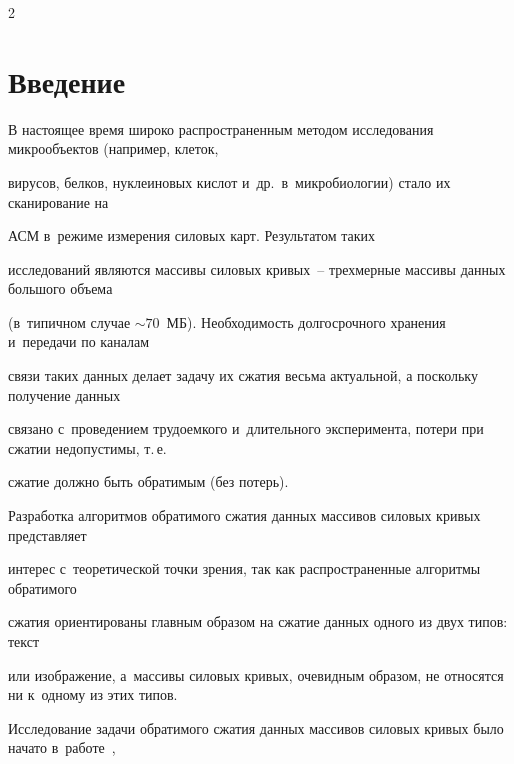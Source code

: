 


\thispagestyle{headings}



\begin{multicols}{2}



\label{st\stat}



\section{Введение}



\vspace*{-4pt}




В настоящее время широко распространенным методом исследования микрообъектов (например, клеток,

 вирусов, белков, нуклеиновых кислот и~др.\ в~микробиологии) стало их сканирование на 

АСМ в~режиме измерения силовых карт. Результатом таких 

 исследований являются массивы силовых кривых~-- трехмерные массивы данных большого объема 

 (в~типичном случае $\sim70$~МБ). Необходимость долгосрочного хранения и~передачи по каналам 

 связи таких данных делает задачу их сжатия весьма актуальной, а поскольку получение данных 

 связано с~проведением трудоемкого и~длительного эксперимента, потери при сжатии недопустимы, т.\,е.\

  сжатие должно быть обратимым (без потерь).



Разработка алгоритмов обратимого сжатия данных массивов силовых кривых представляет 

интерес с~теоретической точки зрения, так как распространенные алгоритмы обратимого 

сжатия \mbox{ориентированы} главным образом на сжатие данных одного из двух типов: текст 

или изображение, а~массивы силовых кривых, очевидным образом, не относятся ни к~одному из этих типов.



Исследование задачи обратимого сжатия данных массивов силовых кривых было начато в~работе~\cite{b1}, 


\end{multicols}
